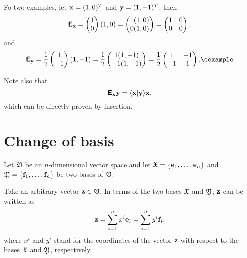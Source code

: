 {
\color{blue}
\bexample
Fo two examples, let
${\bf x}=(1,0)^T$
and
${\bf y}=(1,-1)^T$;
then
$$
\textsf{\textbf{E}}_{\bf x}
=
\begin{pmatrix}
1\\
0
\end{pmatrix}
(1,0)
=
\begin{pmatrix}
1(1,0)\\
0(1,0)
\end{pmatrix}
=
\begin{pmatrix}
1&0\\
0&0
\end{pmatrix}
,
$$
and
$$
\textsf{\textbf{E}}_{\bf y}
= \frac{1}{2}
\begin{pmatrix}
1\\
-1
\end{pmatrix}
(1,-1)
= \frac{1}{2}
\begin{pmatrix}
1(1,-1)\\
-1(1,-1)
\end{pmatrix}
= \frac{1}{2}
\begin{pmatrix}
1&-1\\
-1&1
\end{pmatrix}
.
\textrm{\eexample}
$$
}

Note also that
\begin{equation}
\textsf{\textbf{E}}_{\bf x} {\bf y}= \langle {\bf x}\vert  {\bf y} \rangle {\bf x},
\end{equation}
which can be directly proven by insertion.





\section{Change of basis}
\label{2012-m-ch-fdlvs-changeofbasis}

Let ${\frak V}$ be an $n$-dimensional vector space and let
${\frak X}
=
\{
{\bf e}_1,
\ldots ,
{\bf e}_n
\}$
and
${\frak Y}
=  \{
{\bf f}_1,
\ldots ,
{\bf f}_n
\}$ be two bases of ${\frak V}$.

Take an arbitrary vector ${\bf z}\in {\frak V}$.
In terms of the two bases
${\frak X}$ and
${\frak Y}$,
${\bf z}$ can be written as
\begin{equation}
{\bf z}=
\sum_{i=1}^n x^i{\bf e}_i
=
\sum_{i=1}^n  y^i{\bf f}_i,
\label{2011-m-btbexy}
\end{equation}
where $x^i$ and $y^i$ stand for the coordinates of the vector  ${\bf z}$
with respect to the bases ${\frak X}$ and
${\frak Y}$,
respectively.

